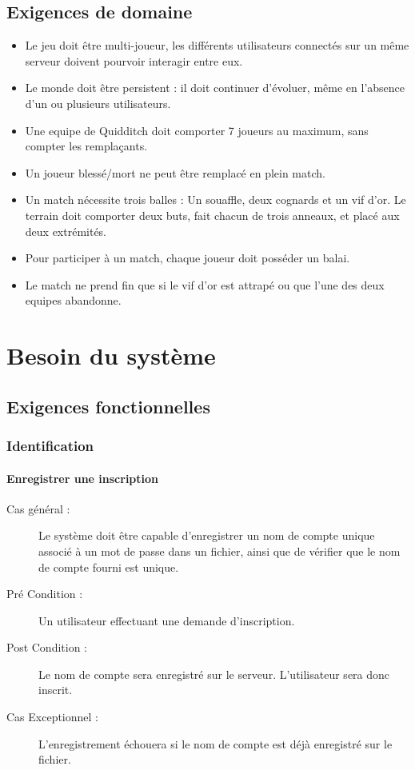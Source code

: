 \documentclass[a4paper]{report}
\begin{document}

\section{Exigences de domaine}
\begin{itemize}
    \item Le jeu doit être multi-joueur, les différents \glspl{utilisateur} connectés sur un même \gls{serveur} doivent pourvoir interagir entre eux.
    \item Le monde doit être persistent : il doit continuer d'évoluer, même en l'absence d'un ou plusieurs \glspl{utilisateur}.
    \item Une \gls{equipe} de Quidditch doit comporter 7 \glspl{joueur} au maximum, sans compter les remplaçants.
    \item Un \gls{joueur} blessé/mort ne peut être remplacé en plein match.
    \item Un match nécessite trois balles : Un souaffle, deux cognards et un vif d'or. Le terrain doit comporter deux buts, fait chacun de trois anneaux, et placé aux deux extrémités.
    \item Pour participer à un match, chaque \gls{joueur} doit posséder un balai.
    \item Le match ne prend fin que si le vif d'or est attrapé ou que l'une des deux \glspl{equipe} abandonne.

\end{itemize}


\chapter{Besoin du système}
\section{Exigences fonctionnelles}

\subsection{Identification}
\subsubsection{Enregistrer une inscription}
\begin{description}
    \item[Cas général :] Le système doit être capable d'enregistrer un nom de compte unique associé à un mot de passe dans un fichier, ainsi que de vérifier que le nom de compte fourni est unique.
    \item[Pré Condition  :] Un \gls{utilisateur} effectuant une demande d'inscription.
    \item[Post Condition :] Le nom de compte sera enregistré sur le \gls{serveur}. L'\gls{utilisateur} sera donc inscrit.
    \item[Cas Exceptionnel :] L'enregistrement échouera si le nom de compte est déjà enregistré sur le fichier.
\end{description}
\end{document}
